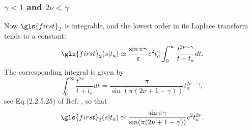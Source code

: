 \subsubsection{$\gamma <1$  and $2\nu < \gamma $} 
Now $\gls{first}_2$ is integrable, and the lowest order in its Laplace transform tends to a constant:
\begin{equation}
 \gls{first}_2(s|t_a) \simeq \frac{\sin \pi \gamma}{\pi}  c^2 t_a^\gamma \int_0^\infty \frac{ t^{2\nu-\gamma}}{t+t_a} dt.
\end{equation}
The corresponding integral is given by
\begin{equation}
 \int_0^\infty \frac{t^{2\nu-\gamma}}{t+t_a} dt = \frac{\pi }{\sin (\pi(2\nu +1- \gamma))}t_a^{2\nu - \gamma} ,
\end{equation}
see Eq.(2.2.5.25) of Ref. \cite{BryPr}, so that
\begin{equation}
 \gls{first}_2(s|t_a) \simeq   \frac{\sin \pi \gamma}{\sin (\pi(2\nu +1- \gamma))}c^2 t_a^{2\nu}.
\end{equation}

